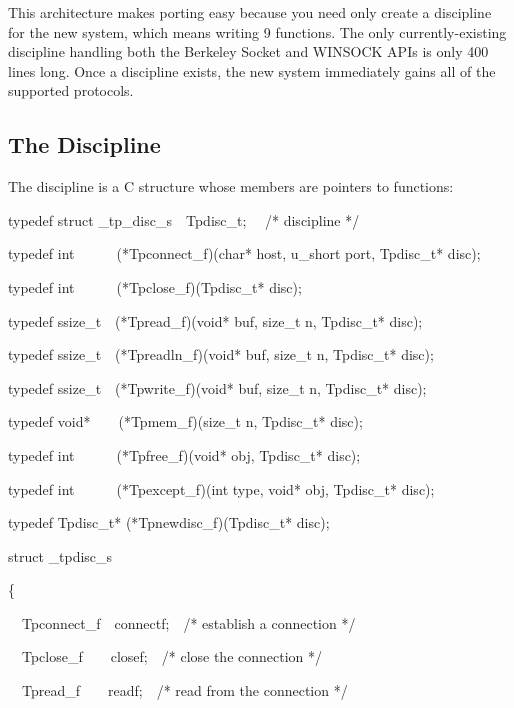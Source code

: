 This architecture makes porting easy because you need only create a
discipline for the new system, which means writing 9 functions. The
only currently-existing discipline handling both the Berkeley Socket
and WINSOCK APIs is only 400 lines long. Once a discipline exists, the
new system immediately gains all of the supported protocols.

\subsection{The Discipline}

The discipline is a C structure whose members are pointers to functions:

\bigskip

{\ttfamily\mdseries
typedef struct \_tp\_disc\_s\ \ Tpdisc\_t; \ \ /* discipline */}


\bigskip

{\ttfamily\mdseries
typedef int\ \ \ \ \ \ (*Tpconnect\_f)(char* host, u\_short port, Tpdisc\_t* disc);}

{\ttfamily\mdseries
typedef int\ \ \ \ \ \ (*Tpclose\_f)(Tpdisc\_t* disc);}

{\ttfamily\mdseries
typedef ssize\_t\ \ (*Tpread\_f)(void* buf, size\_t n, Tpdisc\_t* disc);}

{\ttfamily\mdseries
typedef ssize\_t\ \ (*Tpreadln\_f)(void* buf, size\_t n, Tpdisc\_t* disc);}

{\ttfamily\mdseries
typedef ssize\_t\ \ (*Tpwrite\_f)(void* buf, size\_t n, Tpdisc\_t* disc);}

{\ttfamily\mdseries
typedef void*\ \ \ \ (*Tpmem\_f)(size\_t n, Tpdisc\_t* disc);}

{\ttfamily\mdseries
typedef int\ \ \ \ \ \ (*Tpfree\_f)(void* obj, Tpdisc\_t* disc);}

{\ttfamily\mdseries
typedef int\ \ \ \ \ \ (*Tpexcept\_f)(int type, void* obj, Tpdisc\_t* disc);}

{\ttfamily\mdseries
typedef Tpdisc\_t* (*Tpnewdisc\_f)(Tpdisc\_t* disc);}


\bigskip

{\ttfamily\mdseries
struct \_tpdisc\_s}

{\ttfamily\mdseries
\{}

{\ttfamily\mdseries
\ \ Tpconnect\_f\ \ connectf;\ \ /* establish a connection */}

{\ttfamily\mdseries
\ \ Tpclose\_f\ \ \ \ closef;\ \ /* close the connection */}

{\ttfamily\mdseries
\ \ Tpread\_f\ \ \ \ readf;\ \ /* read from the connection */}


